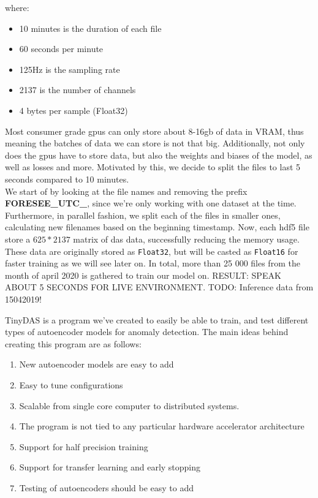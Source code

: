 where:
\begin{itemize}
    \item 10 minutes is the duration of each file
    \item 60 seconds per minute
    \item 125\si{\hertz} is the sampling rate
    \item 2137 is the number of channels
    \item 4 bytes per sample (Float32)
\end{itemize}

Most consumer grade \acrshort{gpu}s can only store about 8-16gb of data in VRAM, thus meaning the batches of data we can store is not that big. Additionally, not only does the \acrshort{gpu}s have to store data, but also the weights and biases of the model, as well as losses and more. Motivated by this, we decide to split the files to last 5 seconds compared to 10 minutes. \\ 

We start of by looking at the file names and removing the prefix \textbf{FORESEE\_UTC\_}, since we're only working with one dataset at the time. Furthermore, in parallel fashion, we split each of the files in smaller ones, calculating new filenames based on the beginning timestamp. Now, each \acrshort{hdf5} file store a $625*2137$ matrix of \acrshort{das} data, successfully reducing the memory usage. 
These data are originally stored as \texttt{Float32}, but will be casted as \texttt{Float16} for faster training as we will see later on. In total, more than 25 000 files from the month of april 2020 is gathered to train our model on. 
RESULT: SPEAK ABOUT 5 SECONDS FOR LIVE ENVIRONMENT.
TODO: Inference data from 15042019!

TinyDAS is a program we've created to easily be able to train, and test different types of autoencoder models for anomaly detection. The main ideas behind creating this program are as follows:

\begin{enumerate}
    \item New autoencoder models are easy to add
    \item Easy to tune configurations
    \item Scalable from single core computer to distributed systems.
    \item The program is not tied to any particular hardware accelerator architecture
    \item Support for half precision training
    \item Support for transfer learning and early stopping
    \item Testing of autoencoders should be easy to add
\end{enumerate}

